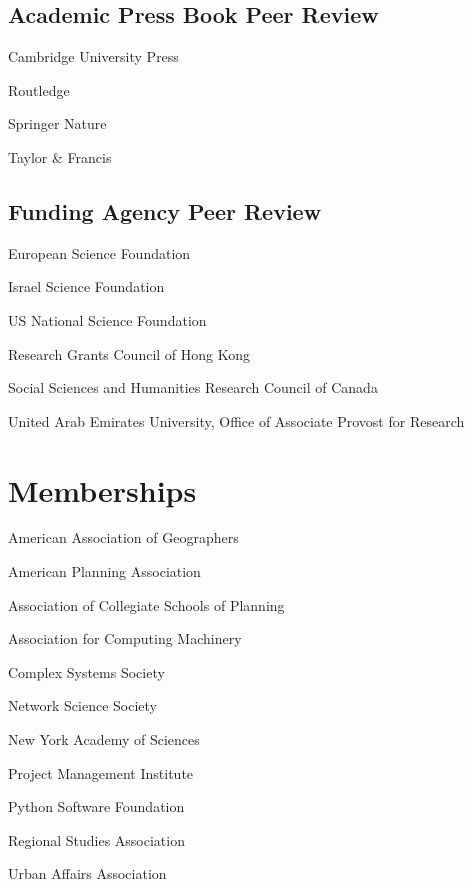 \documentclass[11pt,letterpaper]{report} %
\newcommand{\listitemspace}{0.25em}
\renewenvironment{itemize}
{
  \begin{list}{}{\setlength{\leftmargin}{0em}
      \setlength{\parskip}{0em}
      \setlength{\itemsep}{\listitemspace}
  \setlength{\parsep}{\listitemspace}}}
  {
\end{list}}
\begin{document}
\subsection*{Academic Press Book Peer Review}

\begin{itemize}

  \item Cambridge University Press
  \item Routledge
  \item Springer Nature
  \item Taylor \& Francis

\end{itemize}

\subsection*{Funding Agency Peer Review}

\begin{itemize}

  \item European Science Foundation
  \item Israel Science Foundation
  \item US National Science Foundation
  \item Research Grants Council of Hong Kong
  \item Social Sciences and Humanities Research Council of Canada
  \item United Arab Emirates University, Office of Associate Provost for Research

\end{itemize}

\section*{Memberships}

\begin{itemize}

  \item American Association of Geographers
  \item American Planning Association
  \item Association of Collegiate Schools of Planning
  \item Association for Computing Machinery
  \item Complex Systems Society
  \item Network Science Society
  \item New York Academy of Sciences
  \item Project Management Institute
  \item Python Software Foundation
  \item Regional Studies Association
  \item Urban Affairs Association

\end{itemize}
\end{document}

